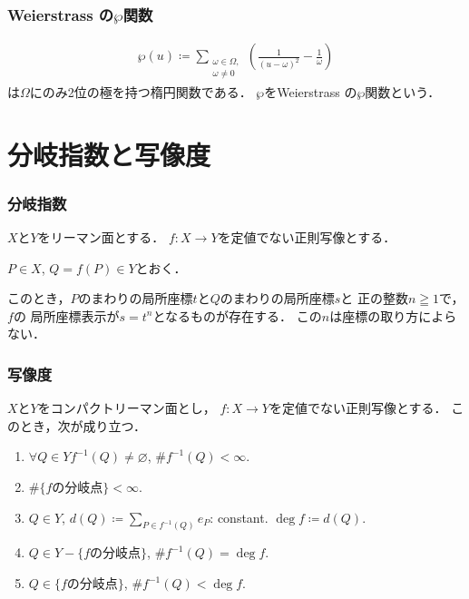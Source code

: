 \documentclass[dvipdfmx,12pt,aspectratio=169]{beamer}%
\begin{document}
\begin{frame}
    \frametitle{Weierstrass の$\wp$関数}

    \begin{Definition}[Weierstrass の$\wp$関数]
        \begin{align*}
            \wp(u)\coloneqq 
            \sum_{\substack{\omega\in\Omega,\\\omega\ne 0}}
            \left(\frac{1}{(u-\omega)^2}-\frac{1}{\omega}\right)
        \end{align*}
        は$\Omega$にのみ2位の極を持つ楕円関数である．
        $\wp$をWeierstrass の$\wp$関数という．
    \end{Definition}

\end{frame}

\section{分岐指数と写像度}

\begin{frame}
    \frametitle{分岐指数}
    \setlength{\baselineskip}{18pt}

    \begin{fact}\label{fact:branch}
        \setlength{\baselineskip}{18pt}
        $X$と$Y$をリーマン面とする．
        $f\colon X\to Y$を定値でない正則写像とする．

        $P\in X$, $Q=f(P)\in Y$とおく．
        
        このとき，$P$のまわりの局所座標$t$と$Q$のまわりの局所座標$s$と
        正の整数$n\geqq 1$で，$f$の
        局所座標表示が$s=t^n$となるものが存在する．
        この$n$は座標の取り方によらない．    
    \end{fact}

\end{frame}

\begin{frame}
    \frametitle{写像度}
    \begin{fact}\label{fact:deg}
        $X$と$Y$をコンパクトリーマン面とし，
        $f\colon X\to Y$を定値でない正則写像とする． 
        このとき，次が成り立つ．
        
        \begin{enumerate}
            \item $\forall Q\in Y$\quad $f^{-1}(Q)\neq\varnothing$, $\#f^{-1}(Q)<\infty$. 
            \item $\#\{f\text{の分岐点}\}<\infty$.
            \item $Q\in Y$, 
            $d(Q)\coloneqq \underset{P\in f^{-1}(Q)}{\sum}e_P$: constant. $\deg f \coloneqq d(Q)$.
            \item $Q\in Y-\{f\text{の分岐点}\}$, $\# f^{-1}(Q)=\deg f$. 
            \item $Q\in \{f\text{の分岐点}\}$, $\# f^{-1}(Q)<\deg f$. 
        \end{enumerate}
        
    \end{fact}

\end{frame}
\end{document}
